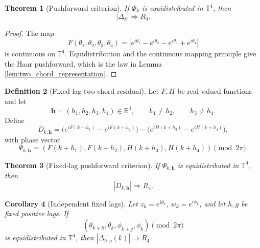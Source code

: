 \documentclass[11pt]{amsart}
\numberwithin{equation}{section}
\theoremstyle{plain}
\newtheorem{theorem}{Theorem}[section]
\newtheorem{corollary}[theorem]{Corollary}
\theoremstyle{definition}
\newtheorem{definition}[theorem]{Definition}
\theoremstyle{remark}
\begin{document}
\begin{theorem}[Pushforward criterion]
\label{thm:pushforward}
If \(\Phi_k\) is equidistributed in \(\mathbb T^4\), then
\begin{equation}
|\Delta_k|\Rightarrow R_4.
\label{eq:pushforward_limit}
\end{equation}
\end{theorem}
\begin{proof}
The map
\begin{equation}
F(\theta_1,\theta_2,\theta_3,\theta_4)
=|e^{i\theta_1}-e^{i\theta_2}-e^{i\theta_3}+e^{i\theta_4}|
\label{eq:pushforward_map}
\end{equation}
is continuous on \(\mathbb T^4\). Equidistribution and the continuous mapping principle give the Haar pushforward, which is the law in Lemma \ref{lem:two_chord_representation}.
\end{proof}

\begin{definition}[Fixed-lag two-chord residual]
\label{def:fixed_lag_residual}
Let \(F,H\) be real-valued functions and let
\begin{equation}
\mathbf h=(h_1,h_2,h_3,h_4)\in\mathbb R^4,
\qquad h_1\neq h_2,
\qquad h_3\neq h_4.
\label{eq:lag_vector}
\end{equation}
Define
\begin{equation}
D_{k,\mathbf h}
=\bigl(e^{iF(k+h_1)}-e^{iF(k+h_2)}\bigr)
-\bigl(e^{iH(k+h_3)}-e^{iH(k+h_4)}\bigr),
\label{eq:Dkh}
\end{equation}
with phase vector
\begin{equation}
\Psi_{k,\mathbf h}
=(F(k+h_1),F(k+h_2),H(k+h_3),H(k+h_4))\pmod{2\pi}.
\label{eq:Psi_kh}
\end{equation}
\end{definition}

\begin{theorem}[Fixed-lag pushforward criterion]
\label{thm:fixed_lag_pushforward}
If \(\Psi_{k,\mathbf h}\) is equidistributed in \(\mathbb T^4\), then
\begin{equation}
|D_{k,\mathbf h}|\Rightarrow R_4.
\label{eq:fixed_lag_limit}
\end{equation}
\end{theorem}

\begin{corollary}[Independent fixed lags]
\label{cor:independent_lags}
Let \(z_k=e^{i\theta_k}\), \(w_k=e^{i\phi_k}\), and let \(h,g\) be fixed positive lags. If
\begin{equation}
(\theta_{k+h},\theta_k,\phi_{k+g},\phi_k)\pmod{2\pi}
\label{eq:lagged_four_phase_vector}
\end{equation}
is equidistributed in \(\mathbb T^4\), then \(|\Delta_{h,g}(k)|\Rightarrow R_4\).
\end{corollary}
\end{document}
